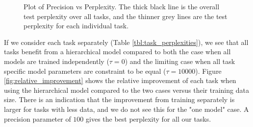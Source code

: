 \documentclass{article}
\begin{document}
\begin{figure}%
    \caption{Plot of Precision vs Perplexity. The thick black line is the overall test perplexity over all tasks, and the thinner grey lines are the test perplexity for each individual task.}
    \label{fig:results_plot}
\end{figure}

If we consider each task separately (Table \ref{tbl:task_perplexities}), we see that all tasks benefit from a hierarchical model compared to both the case when all models are trained independently ($\tau = 0$) and the limiting case when all task specific model parameters are constraint to be equal ($\tau=10000$).
Figure \ref{fig:relative_improvement} shows the relative improvement of each task when using the hierarchical model compared to the two cases versus their training data size. There is an indication that the improvement from training separately is larger for tasks with less data, and we do not see this for the "one model" case.
A precision parameter of $100$ gives the best perplexity for all our tasks.
\end{document}
